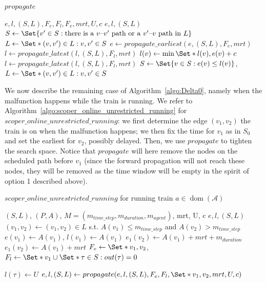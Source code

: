 \documentclass{article}
\DeclareMathOperator{\dom}{dom}
\begin{document}
\begin{algorithm}
	\caption{$propagate$} \label{algo:propagate}
	\begin{algorithmic}[1]
	    \Require $e,l,(S,L),F_e,F_l,F_v,mrt,U,c$
	    \Ensure $e,l,(S,L)$
		    \State $S \leftarrow \Set{v^\prime \in S: \textrm{there is a }v\textrm{--}v^\prime\textrm{ path or a }v^\prime\textrm{--}v\textrm{ path in }L}$
		    \State $L \leftarrow \Set*{(v,v^\prime) \in L: v,v^\prime \in S}$
		\EndFor
	    \State $e \leftarrow propagate\_earliest(e, (S,L), F_e, mrt)$
		\State $l \leftarrow propagate\_latest(l,(S,L),F_l, mrt)$
	        \State $l(v) \leftarrow \min \Set*{l(v), e(v)+c}$
	    \EndFor
	    \State $l \leftarrow propagate\_latest(l,(S,L),F_l, mrt)$
	    \EndIf
		\State $S \leftarrow \Set{v \in S: e(v) \leq l(v)}$, $L \leftarrow \Set*{(v,v^\prime) \in L: v,v^\prime \in S}$

	\end{algorithmic}
\end{algorithm}



We now describe the remaining case of Algorithm~\ref{algo:Delta0}, namely when the malfunction happens while the train is running. We refer to Algorithm~\ref{algo:scoper_online_unrestricted_running} for $scoper\_online\_unrestricted\_running$: we first determine the edge $(v_1,v_2)$ the train is on when the malfunction happens; we then fix the time for $v_1$ as in $S_0$ and set the earliest for $v_2$, possibly delayed. Then, we use $propagate$ to tighten the search space. Notice that $propagate$ will here remove the nodes on the scheduled path before $v_1$ (since the forward propagation will not reach these nodes, they will be removed as the time window will be empty in the spirit of option 1 described above).


\begin{algorithm}
	\caption{$scoper\_online\_unrestricted\_running$ for running train $a \in \dom(\mathcal{A})$} \label{algo:scoper_online_unrestricted_running}
	\begin{algorithmic}[1]
		\Require $(S,L)$, $(P,A)$, $M=(m_{time\_step},m_{duration},m_{agent})$, mrt, U, c
	    \Ensure $e,l,(S,L)$
	    \State $(v_1,v_2) \leftarrow (v_1,v_2) \in L$ s.t. $A(v_1)\leq m_{time\_step}$ and $A(v_2)>m_{time\_step}$
		\State $e(v_1)\leftarrow A(v_1)$, $l(v_1) \leftarrow A(v_1)$
            \State $e_1(v_2) \leftarrow A(v_1)+mrt+m_{duration}$
        \Else
            \State $e_1(v_2) \leftarrow A(v_1)+mrt$
        \EndIf
        \State $F_e \leftarrow \Set*{v_1,v_2}$, $F_l \leftarrow \Set*{v_1} \cup \Set*{\tau \in S: out(\tau)=0}$

	        \State $l(\tau) \leftarrow U$
	    \EndFor
		\State $e,l,(S,L) \leftarrow propagate(e,l,(S,L),F_e,F_l, \Set*{v_1,v_2}, mrt, U, c)$
	\end{algorithmic}
\end{algorithm}
\end{document}
